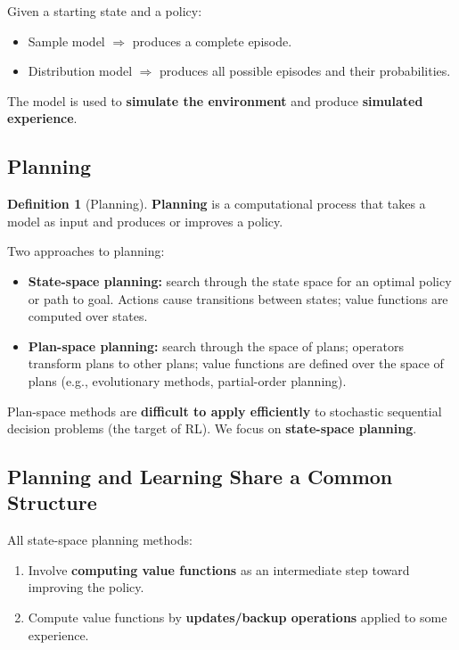 \documentclass[11pt,a4paper]{article}
\theoremstyle{definition}
\newtheorem{definition}{Definition}[section]
\theoremstyle{plain}
\theoremstyle{remark}
\begin{document}
Given a starting state and a policy:
\begin{itemize}
    \item Sample model $\Rightarrow$ produces a complete episode.
    \item Distribution model $\Rightarrow$ produces all possible episodes and their probabilities.
\end{itemize}

The model is used to \textbf{simulate the environment} and produce \textbf{simulated experience}.

\subsection{Planning}

\begin{definition}[Planning]
\textbf{Planning} is a computational process that takes a model as input and produces or improves a policy.
\end{definition}

Two approaches to planning:
\begin{itemize}
    \item \textbf{State-space planning:} search through the state space for an optimal policy or path to goal. Actions cause transitions between states; value functions are computed over states.
    \item \textbf{Plan-space planning:} search through the space of plans; operators transform plans to other plans; value functions are defined over the space of plans (e.g., evolutionary methods, partial-order planning).
\end{itemize}

\begin{tcolorbox}[colback=orange!5!white, colframe=orange!75!black]
Plan-space methods are \textbf{difficult to apply efficiently} to stochastic sequential decision problems (the target of RL). We focus on \textbf{state-space planning}.
\end{tcolorbox}

\subsection{Planning and Learning Share a Common Structure}

All state-space planning methods:
\begin{enumerate}
    \item Involve \textbf{computing value functions} as an intermediate step toward improving the policy.
    \item Compute value functions by \textbf{updates/backup operations} applied to some experience.
\end{enumerate}
\end{document}
